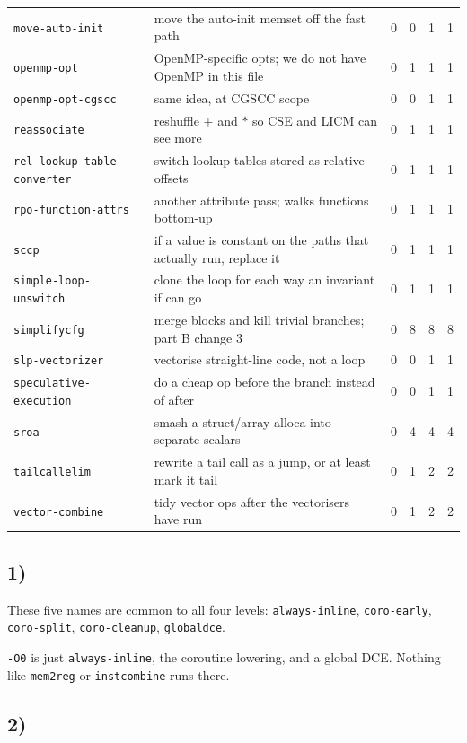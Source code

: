 \documentclass[11pt,a4paper]{article}
\begin{document}
{\begin{longtable}{lp{5.6cm}rrrr}
\texttt{move-auto-init} & move the auto-init memset off the fast path & 0 & 0 & 1 & 1 \\
\texttt{openmp-opt} & OpenMP-specific opts; we do not have OpenMP in this file & 0 & 1 & 1 & 1 \\
\texttt{openmp-opt-cgscc} & same idea, at CGSCC scope & 0 & 0 & 1 & 1 \\
\texttt{reassociate} & reshuffle $+$ and $*$ so CSE and LICM can see more & 0 & 1 & 1 & 1 \\
\texttt{rel-lookup-table-converter} & switch lookup tables stored as relative offsets & 0 & 1 & 1 & 1 \\
\texttt{rpo-function-attrs} & another attribute pass; walks functions bottom-up & 0 & 1 & 1 & 1 \\
\texttt{sccp} & if a value is constant on the paths that actually run, replace it & 0 & 1 & 1 & 1 \\
\texttt{simple-loop-unswitch} & clone the loop for each way an invariant if can go & 0 & 1 & 1 & 1 \\
\texttt{simplifycfg} & merge blocks and kill trivial branches; part B change 3 & 0 & 8 & 8 & 8 \\
\texttt{slp-vectorizer} & vectorise straight-line code, not a loop & 0 & 0 & 1 & 1 \\
\texttt{speculative-execution} & do a cheap op before the branch instead of after & 0 & 0 & 1 & 1 \\
\texttt{sroa} & smash a struct/array alloca into separate scalars & 0 & 4 & 4 & 4 \\
\texttt{tailcallelim} & rewrite a tail call as a jump, or at least mark it tail & 0 & 1 & 2 & 2 \\
\texttt{vector-combine} & tidy vector ops after the vectorisers have run & 0 & 1 & 2 & 2 \\
\hline
\end{longtable}
}

\subsection*{1)}

These five names are common to all four levels:
\texttt{always-inline}, \texttt{coro-early}, \texttt{coro-split},
\texttt{coro-cleanup}, \texttt{globaldce}.

\texttt{-O0} is just \texttt{always-inline}, the coroutine lowering, and a
global DCE. Nothing like \texttt{mem2reg} or \texttt{instcombine} runs there.

\subsection*{2)}
\end{document}
